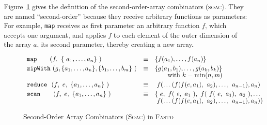 \documentclass[a4paper,11pt]{article}
\newcommand{\fasto}{\textsc{Fasto}\xspace}
\begin{document}
Figure~\ref{fig:soac} gives the definition of the 
second-order-array combinators (\textsc{soac}).  They are named ``second-order''
because they receive arbitrary functions as parameters: For example,
{\tt map} receives as first parameter an arbitrary function $f$, which 
accepts one argument, and applies $f$
to each element of the outer dimension of the array $a$, its second 
parameter, thereby creating a new array.

\begin{figure}[h] \vspace{-2ex}
\[\renewcommand{\arraystretch}{0.87}
\begin{array}{lcl}
\keyw{map}\hspace*{2em}(f, \ \{\ a_1,\ldots, a_n \}\ ) 
  &\equiv& \{f(a_1),\ldots,f(a_n)\}\\[0.9ex]
\keyw{zipWith}\ (g, \{a_1,\ldots, a_n\} , \{b_1,\ldots, b_m\}\ )
  &\equiv& \{g(a_1, b_1),\ldots,g(a_k, b_k)\}\\
& & \hspace*{2em}\mbox{with } k = \mbox{min}(n,m)\\[0.9ex]
\keyw{reduce}\ \ (f,\ e,\ \{a_1,\ldots, a_n\} \ )
  &\equiv& \ f(\ldots (f(f(e, a_1),\ a_2), \ldots,\ a_{n-1}), a_n)\\[0.9ex]
\keyw{scan}\ \ \ \ \ \ (f,\ e,\ \{a_1,\ldots, a_n\} \ )
  &\equiv& \{\ e, \ f(\ e, \ a_1 \ ),\ f(\ f(\ e,\ a_1),\ a_2 \ ),\ldots\\
       & & \ f(\ldots (f(f(e, a_1),\ a_2), \ldots,\ a_{n-1}), a_n) \} %
%
\end{array}   
\vspace{-2ex}
\renewcommand{\arraystretch}{1.0}
\] 
\caption{Second-Order Array Combinators (\textsc{Soac}) in \fasto}
\label{fig:soac}
\end{figure}
\end{document}
